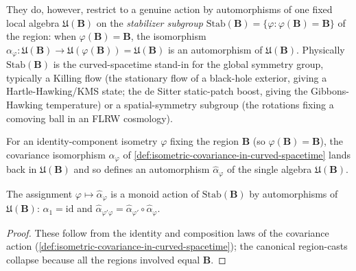They do, however, restrict to a genuine action by automorphisms of one fixed local algebra $\mathfrak{U}(\mathbf{B})$ on the \emph{stabilizer subgroup} $\mathrm{Stab}(\mathbf{B}) = \{\varphi : \varphi(\mathbf{B}) = \mathbf{B}\}$ of the region: when $\varphi(\mathbf{B}) = \mathbf{B}$, the isomorphism $\alpha_\varphi : \mathfrak{U}(\mathbf{B}) \to \mathfrak{U}(\varphi(\mathbf{B})) = \mathfrak{U}(\mathbf{B})$ is an automorphism of $\mathfrak{U}(\mathbf{B})$. Physically $\mathrm{Stab}(\mathbf{B})$ is the curved-spacetime stand-in for the global symmetry group, typically a Killing flow (the stationary flow of a black-hole exterior, giving a Hartle-Hawking/KMS state; the de Sitter static-patch boost, giving the Gibbons-Hawking temperature) or a spatial-symmetry subgroup (the rotations fixing a comoving ball in an FLRW cosmology).

\begin{definition}
    \label{def:stabilizer-action-in-curved-spacetime}
    \leanok
    For an identity-component isometry $\varphi$ fixing the region $\mathbf{B}$ (so $\varphi(\mathbf{B}) = \mathbf{B}$), the covariance isomorphism $\alpha_\varphi$ of \ref{def:isometric-covariance-in-curved-spacetime} lands back in $\mathfrak{U}(\mathbf{B})$ and so defines an automorphism $\hat\alpha_\varphi$ of the single algebra $\mathfrak{U}(\mathbf{B})$.
\end{definition}

\begin{lemma}
    \label{lmm:stabilizer-action-laws-in-curved-spacetime}
    \leanok
    The assignment $\varphi \mapsto \hat\alpha_\varphi$ is a monoid action of $\mathrm{Stab}(\mathbf{B})$ by automorphisms of $\mathfrak{U}(\mathbf{B})$: $\hat\alpha_1 = \mathrm{id}$ and $\hat\alpha_{\varphi'\varphi} = \hat\alpha_{\varphi'}\circ\hat\alpha_\varphi$.
\end{lemma}
\begin{proof}
    \leanok
    These follow from the identity and composition laws of the covariance action (\ref{def:isometric-covariance-in-curved-spacetime}); the canonical region-casts collapse because all the regions involved equal $\mathbf{B}$.
\end{proof}

